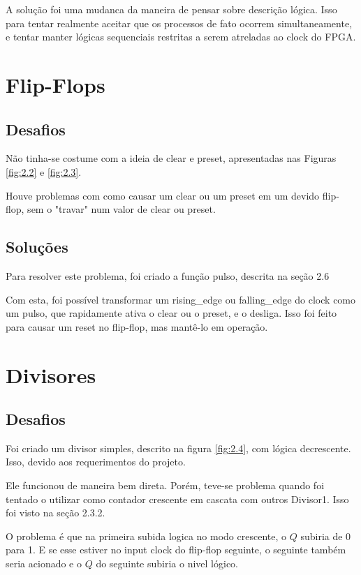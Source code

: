 A solução foi uma mudanca da maneira de pensar sobre descrição lógica. Isso para tentar realmente aceitar que os processos de fato ocorrem simultaneamente, e tentar manter lógicas sequenciais restritas a serem atreladas ao clock do FPGA.

\section{Flip-Flops}

\subsection{Desafios}

Não tinha-se costume com a ideia de clear e preset, apresentadas nas Figuras \ref{fig:2.2} e \ref{fig:2.3}.

Houve problemas com como causar um clear ou um preset em um devido flip-flop, sem o "travar" num valor de clear ou preset.

\subsection{Soluções}

Para resolver este problema, foi criado a função pulso, descrita na seção 2.6

Com esta, foi possível transformar um rising\_edge ou falling\_edge do clock como um pulso, que rapidamente ativa o clear ou o preset, e o desliga. Isso foi feito para causar um reset no flip-flop, mas mantê-lo em operação.

\section{Divisores}

\subsection{Desafios}

Foi criado um divisor simples, descrito na figura \ref{fig:2.4}, com lógica decrescente. Isso, devido aos requerimentos do projeto.

Ele funcionou de maneira bem direta. Porém, teve-se problema quando foi tentado o utilizar como contador crescente em cascata com outros Divisor1. Isso foi visto na seção 2.3.2.

O problema é que na primeira subida logica no modo crescente, o $Q$ subiria de 0 para 1. E se esse estiver no input clock do flip-flop seguinte, o seguinte também seria acionado e o $Q$ do seguinte subiria o nivel lógico.

